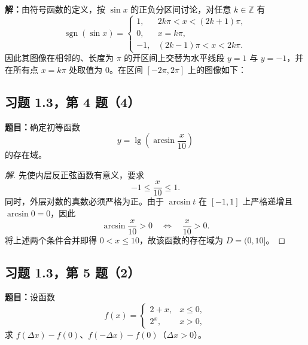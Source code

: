 \documentclass[UTF8, fontset=fandol, a4paper, 12pt]{ctexart}
\DeclareMathOperator{\sgn}{sgn}
\theoremstyle{definition}
\begin{document}
\noindent\textbf{解：}由符号函数的定义，按 $\sin x$ 的正负分区间讨论，对任意 $k\in\mathbb Z$ 有
\[
 \sgn(\sin x)=
 \begin{cases}
  1,&2k\pi<x<(2k+1)\pi,\\
  0,&x=k\pi,\\
  -1,&(2k-1)\pi<x<2k\pi.
 \end{cases}
\]
因此其图像在相邻的、长度为 $\pi$ 的开区间上交替为水平线段 $y=1$ 与 $y=-1$，并在所有点 $x=k\pi$ 处取值为 $0$。在区间 $[-2\pi,2\pi]$ 上的图像如下：

\begin{center}
\end{center}

\subsection{习题 1.3，第 4 题（4）}
\noindent\textbf{题目：}确定初等函数
\[
 y=\lg\left(\arcsin\frac{x}{10}\right)
\]
的存在域。

\begin{proof}[解]
先使内层反正弦函数有意义，要求
\[
 -1\le \frac{x}{10}\le 1.
\]
同时，外层对数的真数必须严格为正。由于 $\arcsin t$ 在 $[-1,1]$ 上严格递增且 $\arcsin 0=0$，因此
\[
 \arcsin\frac{x}{10}>0
 \quad\Longleftrightarrow\quad
 \frac{x}{10}>0.
\]
将上述两个条件合并即得 $0<x\le 10$，故该函数的存在域为 $D=(0,10]$。
\end{proof}

\subsection{习题 1.3，第 5 题（2）}
\noindent\textbf{题目：}设函数
\[
 f(x)=
 \begin{cases}
  2+x,&x\le0,\\
  2^x,&x>0,
 \end{cases}
\]
求 $f(\Delta x)-f(0)$、$f(-\Delta x)-f(0)$（$\Delta x>0$）。
\end{document}
